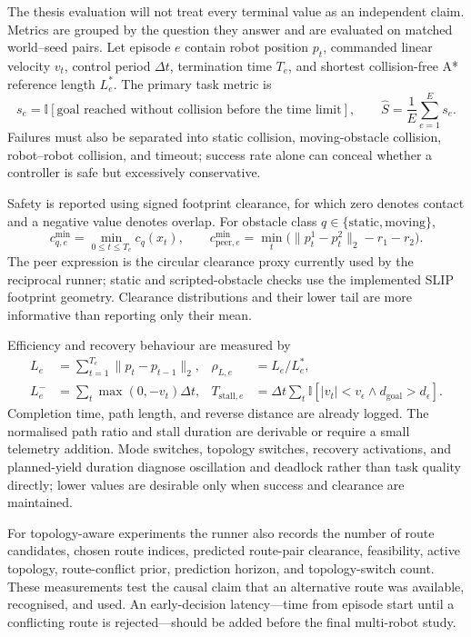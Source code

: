 \documentclass[11pt,a4paper]{article}
\begin{document}
The thesis evaluation will not treat every terminal value as an independent
claim.  Metrics are grouped by the question they answer and are evaluated on
matched world--seed pairs.  Let episode $e$ contain robot position $p_t$,
commanded linear velocity $v_t$, control period $\Delta t$, termination time
$T_e$, and shortest collision-free A* reference length $L_e^{*}$.  The primary
task metric is
\begin{equation}
 s_e=\mathbb I[\text{goal reached without collision before the time limit}],
 \qquad \hat S=\frac{1}{E}\sum_{e=1}^{E}s_e .
 \label{eq:benchmark-success}
\end{equation}
Failures must also be separated into static collision, moving-obstacle
collision, robot--robot collision, and timeout; success rate alone can conceal
whether a controller is safe but excessively conservative.

Safety is reported using signed footprint clearance, for which zero denotes
contact and a negative value denotes overlap.  For obstacle class
$q\in\{\mathrm{static},\mathrm{moving}\}$,
\begin{equation}
 c^{\min}_{q,e}=\min_{0\leq t\leq T_e}c_q(x_t),
 \qquad
 c^{\min}_{\mathrm{peer},e}
 =\min_t\bigl(\lVert p_t^1-p_t^2\rVert_2-r_1-r_2\bigr).
 \label{eq:benchmark-clearance}
\end{equation}
The peer expression is the circular clearance proxy currently used by the
reciprocal runner; static and scripted-obstacle checks use the implemented
SLIP footprint geometry.  Clearance distributions and their lower tail are
more informative than reporting only their mean.

Efficiency and recovery behaviour are measured by
\begin{align}
 L_e &= \sum_{t=1}^{T_e}\lVert p_t-p_{t-1}\rVert_2,
 &\rho_{L,e}&=L_e/L_e^{*},\\
 L_e^{-} &= \sum_t\max(0,-v_t)\Delta t,
 &T_{\mathrm{stall},e}&=\Delta t\sum_t
 \mathbb I[|v_t|<v_{\epsilon}\wedge d_{\mathrm{goal}}>d_{\epsilon}].
 \label{eq:benchmark-efficiency}
\end{align}
Completion time, path length, and reverse distance are already logged.  The
normalised path ratio and stall duration are derivable or require a small
telemetry addition.  Mode switches, topology switches, recovery activations,
and planned-yield duration diagnose oscillation and deadlock rather than task
quality directly; lower values are desirable only when success and clearance
are maintained.

For topology-aware experiments the runner also records the number of route
candidates, chosen route indices, predicted route-pair clearance, feasibility,
active topology, route-conflict prior, prediction horizon, and topology-switch
count.  These measurements test the causal claim that an alternative route was
available, recognised, and used.  An early-decision latency---time from episode
start until a conflicting route is rejected---should be added before the final
multi-robot study.
\end{document}
